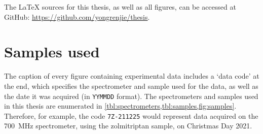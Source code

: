 The \LaTeX{} sources for this thesis, as well as all figures, can be accessed at GitHub: \url{https://github.com/yongrenjie/thesis}.


\section*{Samples used}

The caption of every figure containing experimental data includes a `data code' at the end, which specifies the spectrometer and sample used for the data, as well as the date it was acquired (in \texttt{YYMMDD} format).
The spectrometers and samples used in this thesis are enumerated in \cref{tbl:spectrometers,tbl:samples,fig:samples}.
Therefore, for example, the code \texttt{7Z-211225} would represent data acquired on the \qty{700}{\MHz} spectrometer, using the zolmitriptan sample, on Christmas Day 2021.

